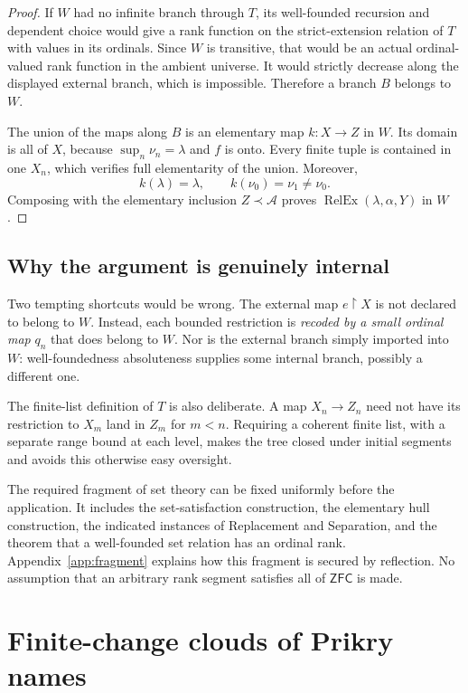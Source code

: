\documentclass[11pt,letterpaper]{article}
\theoremstyle{definition}
\newcommand{\ZFC}{\mathsf{ZFC}}
\newcommand{\restr}{\mathbin{\upharpoonright}}
\newcommand{\RelEx}{\operatorname{RelEx}}
\begin{document}
\begin{proof}
If $W$ had no infinite branch through $T$, its well-founded recursion
and dependent choice would give a rank function on the strict-extension
relation of $T$ with values in its ordinals. Since $W$ is transitive,
that would be an actual ordinal-valued rank function in the ambient
universe. It would strictly decrease along the displayed external branch,
which is impossible. Therefore a branch $B$ belongs to $W$.

The union of the maps along $B$ is an elementary map $k:X\to Z$ in $W$.
Its domain is all of $X$, because $\sup_n\nu_n=\lambda$ and $f$ is
onto. Every finite tuple is contained in one $X_n$, which verifies full
elementarity of the union. Moreover,
\[
 k(\lambda)=\lambda,\qquad k(\nu_0)=\nu_1\ne\nu_0.
\]
Composing with the elementary inclusion $Z\prec\mathcal A$ proves
$\RelEx(\lambda,\alpha,Y)$ in $W$.
\end{proof}

\subsection{Why the argument is genuinely internal}

Two tempting shortcuts would be wrong. The external map $e\restr X$
is not declared to belong to $W$. Instead, each bounded restriction is
\emph{recoded by a small ordinal map} $q_n$ that does belong to $W$.
Nor is the external branch simply imported into $W$: well-foundedness
absoluteness supplies some internal branch, possibly a different one.

The finite-list definition of $T$ is also deliberate. A map
$X_n\to Z_n$ need not have its restriction to $X_m$ land in $Z_m$ for
$m<n$. Requiring a coherent finite list, with a separate range bound at
each level, makes the tree closed under initial segments and avoids this
otherwise easy oversight.

The required fragment of set theory can be fixed uniformly before the
application. It includes the set-satisfaction construction, the elementary
hull construction, the indicated instances of Replacement and Separation,
and the theorem that a well-founded set relation has an ordinal rank.
Appendix~\ref{app:fragment} explains how this fragment is secured by
reflection. No assumption that an arbitrary rank segment satisfies all
of $\ZFC$ is made.

\section{Finite-change clouds of Prikry names}\label{sec:clouds}
\end{document}
